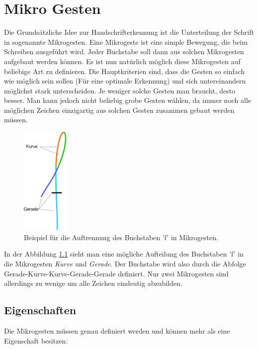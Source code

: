 \chapter{Mikro Gesten}

Die Grundsätzliche Idee zur Handschrifterkennung ist die Unterteilung der Schrift in sogenannte Mikrogesten. Eine Mikrogeste ist eine simple Bewegung, die beim Schreiben ausgeführt wird. Jeder Buchstabe soll dann aus solchen Mikrogesten aufgebaut werden können. 
Es ist nun natürlich möglich diese Mikrogesten auf beliebige Art zu definieren. Die Hauptkriterien sind, dass die Gesten so einfach wie möglich sein sollen (Für eine optimale Erkennung) und sich untereinandern möglichst stark unterscheiden. Je weniger solche Gesten man braucht, desto besser. Man kann jedoch nicht beliebig grobe Gesten wählen, da immer noch alle möglichen Zeichen einzigartig aus solchen Gesten zusammen gebaut werden müssen.

\begin{figure}[h!]
  \centering
    \includegraphics[width=0.2\textwidth]{./img/mikrogesten_beispiel.pdf}
  \caption{Beispiel für die Auftrennung des Buchstaben 'f' in Mikrogesten.}
  \label{mikrogeste_beispiel}
\end{figure}

In der Abbildung \ref{mikrogeste_beispiel} sieht man eine mögliche Aufteilung des Buchstaben 'f' in die Mikrogesten \emph{Kurve} und \emph{Gerade}. Der Buchstabe wird also durch die Abfolge Gerade-Kurve-Kurve-Gerade-Gerade definiert. Nur zwei Mikrogesten sind allerdings zu wenige um alle Zeichen eindeutig abzubilden.

\section{Eigenschaften}
Die Mikrogesten müssen genau definiert werden und können mehr als eine Eigenschaft besitzen:


